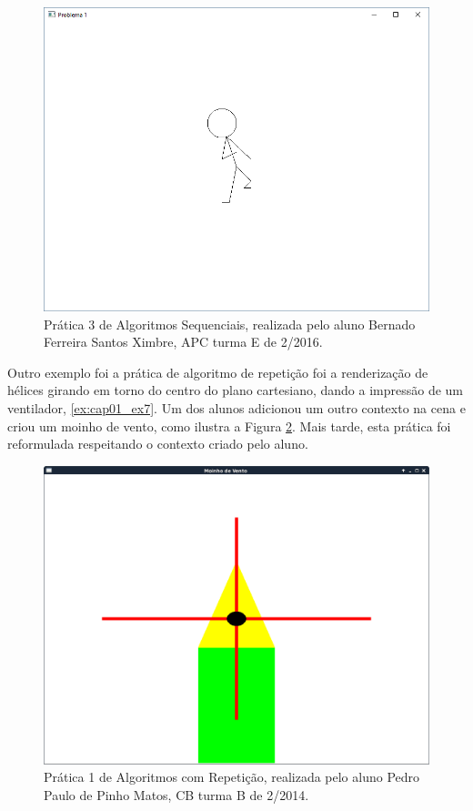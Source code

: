  \begin{figure}[H]
 \begin{center}
 \includegraphics[scale=.5]{img/aluno_lab1.png}
 \end{center}
 \caption{Prática 3 de Algoritmos Sequenciais, realizada pelo aluno Bernado Ferreira Santos Ximbre, \acrshort{APC} turma E de 2/2016.}
 \label{fig:lab1}
 \end{figure}

Outro exemplo foi a prática de algoritmo de repetição foi a renderização de hélices girando em torno do centro do plano cartesiano, dando a impressão de um ventilador, \ref{ex:cap01_ex7}. Um dos alunos adicionou um outro contexto na cena e criou um moinho de vento, como ilustra a Figura \ref{fig:lab2}. Mais tarde, esta prática foi reformulada respeitando o contexto criado pelo aluno.

 \begin{figure}[H]
 \begin{center}
 \includegraphics[scale=.25]{img/moinho.png}
 \end{center}
 \caption{Prática 1 de Algoritmos com Repetição, realizada pelo aluno Pedro Paulo de Pinho Matos, \acrshort{CB} turma B de 2/2014.}
 \label{fig:lab2}
 \end{figure}

